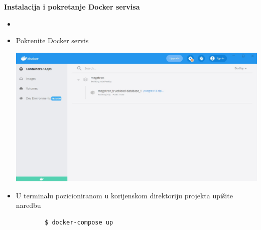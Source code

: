 			
			
			\textbf{Instalacija i pokretanje Docker servisa}
			\begin{itemize}
    		    \item {}
			    \item Pokrenite Docker servis
			    
            	    \begin{minipage}{\linewidth}             
    	    	        \includegraphics[scale=0.45]{slike/deploy/Docker1.jpg}
                    	\centering
                    	\label{fig:DockerUI}
                    \end{minipage}
    	    	
    	    	\item U terminalu pozicioniranom u korijenskom direktoriju projekta upišite naredbu 

        	    	\begin{verbatim}
        $ docker-compose up
        	    	\end{verbatim}
        	    	

\end{itemize}
